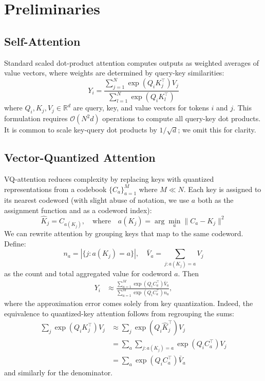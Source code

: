 \section{Preliminaries}
\label{sec:preliminaries}

\subsection{Self-Attention}

Standard scaled dot-product attention \cite{vaswani2017attention} computes outputs as weighted averages of value vectors, where weights are determined by query-key similarities:
\begin{equation}
\label{eq:standardattention}
Y_i = \frac{\sum_{j=1}^{N} \exp(Q_i K_j^{\top}) V_j}{\sum_{l=1}^{N} \exp(Q_i K_l^{\top})}
\end{equation}
where $Q_i, K_j, V_j \in \mathbb{R}^d$ are query, key, and value vectors for tokens $i$ and $j$. This formulation requires $\mathcal{O}(N^2d)$ operations to compute all query-key dot products. It is common to scale key-query dot products by $1/\sqrt{d}$; we omit this for clarity.

\subsection{Vector-Quantized Attention}
VQ-attention reduces complexity by replacing keys with quantized representations from a codebook $\{C_a\}_{a=1}^{M}$ where $M \ll N$. Each key is assigned to its nearest codeword (with slight abuse of notation, we use $a$ both as the assignment function and as a codeword index):
\begin{equation}
\hat{K}_j = C_{a(K_j)}, \quad \text{where} \quad a(K_j) = \arg\min_{a} \|C_a - K_j\|^2
\end{equation}
We can rewrite attention by grouping keys that map to the same codeword. Define:
\begin{equation}
\label{eq:aggregates}
n_a = |\{j : a(K_j) = a\}|, \quad \bar{V}_a = \sum_{j : a(K_j)=a} V_j
\end{equation}
as the count and total aggregated value for codeword $a$. Then
\begin{align}
Y_i &\approx \frac{\sum_{a=1}^{M} \exp(Q_i C_a^{\top}) \bar{V}_a}{\sum_{a=1}^{M} \exp(Q_i C_a^{\top}) n_a},
\end{align}
where the approximation error comes solely from key quantization. Indeed, the equivalence to quantized-key attention follows from regrouping the sums:
\begin{align*}
\sum_{j} \exp(Q_i K_j^\top)V_j &\approx \sum_{j} \exp(Q_i \hat{K}_j^\top)V_j \\
&= \sum_a \sum_{j : a(K_j)=a} \exp(Q_i C_a^\top)V_j \\
&= \sum_a \exp(Q_i C_a^\top) \bar{V}_a
\end{align*}
and similarly for the denominator.

